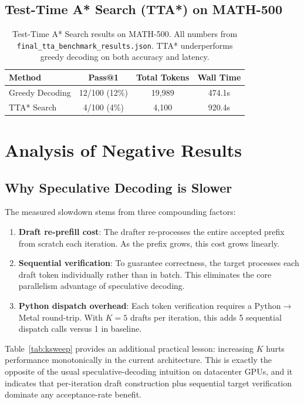 \documentclass[11pt]{article}
\begin{document}
\subsection{Test-Time A* Search (TTA*) on MATH-500}

\begin{table}[h]
\centering
\begin{tabular}{@{}lccc@{}}
\toprule
\textbf{Method} & \textbf{Pass@1} & \textbf{Total Tokens} & \textbf{Wall Time} \\ \midrule
Greedy Decoding  & 12/100 (12\%) & 19,989 & 474.1s \\
TTA* Search      & 4/100 (4\%)   & 4,100  & 920.4s \\ \bottomrule
\end{tabular}
\vspace{2mm}
\caption{Test-Time A* Search results on MATH-500. All numbers from \texttt{final\_tta\_benchmark\_results.json}. TTA* underperforms greedy decoding on both accuracy and latency.}
\label{tab:tta}
\end{table}

\section{Analysis of Negative Results}

\subsection{Why Speculative Decoding is Slower}

The measured slowdown stems from three compounding factors:

\begin{enumerate}
    \item \textbf{Draft re-prefill cost}: The drafter re-processes the entire accepted prefix from scratch each iteration. As the prefix grows, this cost grows linearly.
    \item \textbf{Sequential verification}: To guarantee correctness, the target processes each draft token individually rather than in batch. This eliminates the core parallelism advantage of speculative decoding.
    \item \textbf{Python dispatch overhead}: Each token verification requires a Python$\to$Metal round-trip. With $K=5$ drafts per iteration, this adds 5 sequential dispatch calls versus 1 in baseline.
\end{enumerate}

Table~\ref{tab:ksweep} provides an additional practical lesson: increasing $K$ hurts performance monotonically in the current architecture. This is exactly the opposite of the usual speculative-decoding intuition on datacenter GPUs, and it indicates that per-iteration draft construction plus sequential target verification dominate any acceptance-rate benefit.
\end{document}
